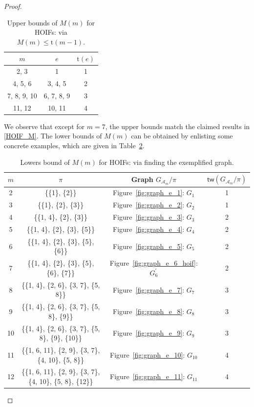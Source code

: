 \documentclass[12pt]{article}
\theoremstyle{plain}
\theoremstyle{definition}
\newcommand{\treewidthp}[1]{\mathsf{tw}(#1)}
\newcommand{\graphform}[1]{G_{#1}}
\def\calA{\mathcal{A}}
\begin{document}
\begin{bibunit}[agsm]
\begin{proof}
\begin{table}[ht]
    \centering
    \caption{Upper bounds of $M(m)$ for HOIFs: via $M(m) \leq \mathrm{t}(m-1)$. }
    \label{tab:HOIF_upper_bound}
    \begin{tabular}{ccc}
        \toprule
        $m$ & $e$ & $\mathrm{t}(e)$ \\
        \midrule
        2, 3 & 1 & 1 \\
        4, 5, 6 & 3, 4, 5 & 2 \\
        7, 8, 9, 10 & 6, 7, 8, 9 & 3 \\
        11, 12 & 10, 11 & 4 \\
        \bottomrule
    \end{tabular}
\end{table}

We observe that except for $m=7$, the upper bounds match the claimed results in \eqref{HOIF_M}. The lower bounds of $M(m)$ can be obtained by enlisting some concrete examples, which are given in Table~\ref{tab:HOIF_lower_bound}. 

\begin{table}[h]
\centering
\caption{Lowers bound of $M(m)$ for HOIFs: via finding the exemplified graph.}
\label{tab:HOIF_lower_bound}
\begin{tabular}{c c c c}
\toprule
$m$ & $\pi$ & Graph $\graphform{\calA_{m}} /\pi$ & $\treewidthp{\graphform{\calA_{m}} /\pi}$ \\
\midrule
2  & \{\{1\}, \{2\}\} & Figure~\ref{fig:graph_e_1}: $G_1$ & 1 \\
3  & \{\{1\}, \{2\}, \{3\}\} & Figure~\ref{fig:graph_e_2}: $G_2$ & 1 \\
4  & \{\{1, 4\}, \{2\}, \{3\}\} & Figure~\ref{fig:graph_e_3}: $G_3$ & 2 \\
5  & \{\{1, 4\}, \{2\}, \{3\}, \{5\}\} & Figure~\ref{fig:graph_e_4}: $G_4$ & 2 \\
6  & \{\{1, 4\}, \{2\}, \{3\}, \{5\}, \{6\}\} & Figure~\ref{fig:graph_e_5}: $G_5$ & 2 \\
7  & \{\{1, 4\}, \{2\}, \{3\}, \{5\}, \{6\}, \{7\}\} & Figure~\ref{fig:graph_e_6_hoif}: $G_6^{\prime}$ & 2 \\
8  & \{\{1, 4\}, \{2, 6\}, \{3, 7\}, \{5, 8\}\} & Figure~\ref{fig:graph_e_7}: $G_7$ & 3 \\
9  & \{\{1, 4\}, \{2, 6\}, \{3, 7\}, \{5, 8\}, \{9\}\} & Figure~\ref{fig:graph_e_8}: $G_8$ & 3 \\
10 & \{\{1, 4\}, \{2, 6\}, \{3, 7\}, \{5, 8\}, \{9\}, \{10\}\} & Figure~\ref{fig:graph_e_9}: $G_9$ & 3 \\
11 & \{\{1, 6, 11\}, \{2, 9\}, \{3, 7\}, \{4, 10\}, \{5, 8\}\} & Figure~\ref{fig:graph_e_10}: $G_{10}$ & 4 \\
12 & \{\{1, 6, 11\}, \{2, 9\}, \{3, 7\}, \{4, 10\}, \{5, 8\}, \{12\}\} & Figure~\ref{fig:graph_e_11}: $G_{11}$ & 4 \\
\bottomrule
\end{tabular}
\end{table}



\end{proof}
\end{bibunit}
\end{document}
